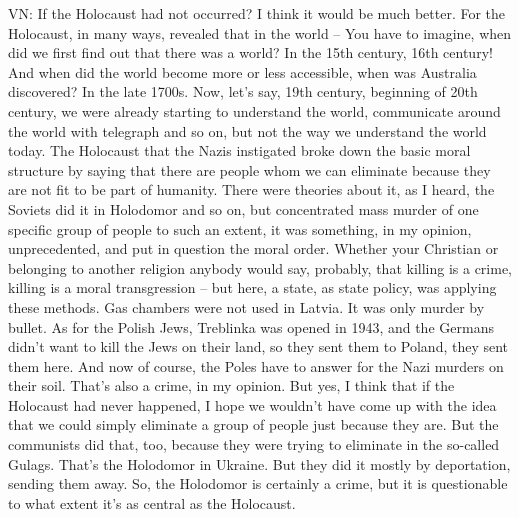 VN: If the Holocaust had not occurred? I think it would be much better. For the Holocaust, in many ways, revealed that in the world – You have to imagine, when did we first find out that there was a world? In the 15th century, 16th century! And when did the world become more or less accessible, when was Australia discovered? In the late 1700s. Now, let’s say, 19th century, beginning of 20th century, we were already starting to understand the world, communicate around the world with telegraph and so on, but not the way we understand the world today. The Holocaust that the Nazis instigated broke down the basic moral structure by saying that there are people whom we can eliminate because they are not fit to be part of humanity. There were theories about it, as I heard, the Soviets did it in Holodomor and so on, but concentrated mass murder of one specific group of people to such an extent, it was something, in my opinion, unprecedented, and put in question the moral order. Whether your Christian or belonging to another religion anybody would say, probably, that killing is a crime, killing is a moral transgression – but here, a state, as state policy, was applying these methods. Gas chambers were not used in Latvia. It was only murder by bullet. As for the Polish Jews, Treblinka was opened in 1943, and the Germans didn’t want to kill the Jews on their land, so they sent them to Poland, they sent them here. And now of course, the Poles have to answer for the Nazi murders on their soil. That’s also a crime, in my opinion. But yes, I think that if the Holocaust had never happened, I hope we wouldn’t have come up with the idea that we could simply eliminate a group of people just because they are. But the communists did that, too, because they were trying to eliminate in the so-called Gulags. That’s the Holodomor in Ukraine. But they did it mostly by deportation, sending them away. So, the Holodomor is certainly a crime, but it is questionable to what extent it’s as central as the Holocaust. 
